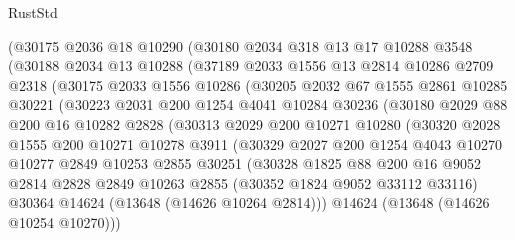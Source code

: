 \begin{lexlean}{RustStd}
\begin{coremodule}
        (@30175
          @2036
          @18
          @10290
          (@30180
            @2034
            @318
            @13
            @17
            @10288
            @3548
            (@30188
              @2034
              @13
              @10288
              (@37189
                @2033
                @1556
                @13
                @2814
                @10286
                @2709
                @2318
                (@30175
                  @2033
                  @1556
                  @10286
                  (@30205
                    @2032
                    @67
                    @1555
                    @2861
                    @10285
                    @30221
                    (@30223
                      @2031
                      @200
                      @1254
                      @4041
                      @10284
                      @30236
                      (@30180
                        @2029
                        @88
                        @200
                        @16
                        @10282
                        @2828
                        (@30313
                          @2029
                          @200
                          @10271
                          @10280
                          (@30320
                            @2028
                            @1555
                            @200
                            @10271
                            @10278
                            @3911
                            (@30329
                              @2027
                              @200
                              @1254
                              @4043
                              @10270
                              @10277
                              @2849
                              @10253
                              @2855
                              @30251
                              (@30328
                                @1825
                                @88
                                @200
                                @16
                                @9052
                                @2814
                                @2828
                                @2849
                                @10263
                                @2855
                                (@30352 @1824 @9052 @33112 @33116)
                                @30364
                                @14624
                                (@13648 (@14626 @10264 @2814)))
                              @14624
                              (@13648 (@14626 @10254 @10270)))

\end{coremodule}
\end{lexlean}
